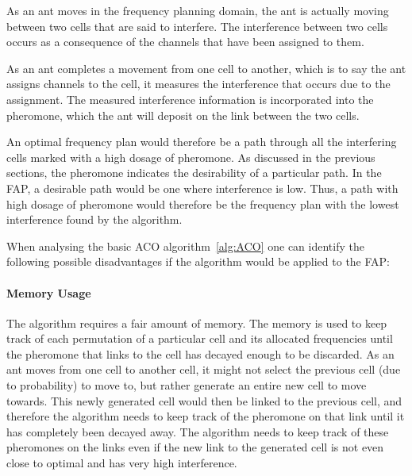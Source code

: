 As an ant moves in the frequency planning domain, the ant is actually moving between two cells that are said to interfere. The interference between two cells occurs as a consequence of the channels that have been assigned to them. 

As an ant completes a movement from one cell to another, which is to say the ant assigns channels to the cell, it measures the interference that occurs due to the assignment.  The measured interference information is incorporated into the pheromone, which the ant will deposit on the link between the two cells.

An optimal frequency plan would therefore be a path through all the interfering cells marked with a high dosage of pheromone. As discussed in the previous sections, the pheromone indicates the desirability of a particular path. In the FAP, a desirable path would be one where interference is low. Thus, a path with high dosage of pheromone would therefore be the frequency plan with the lowest interference found by the algorithm.

When analysing the basic ACO algorithm~\ref{alg:ACO} one can identify the following possible disadvantages if the algorithm would be applied to the FAP:
\paragraph{Memory Usage}
The algorithm requires a fair amount of memory. The memory is used to keep track of each permutation of a particular cell and its allocated frequencies until the pheromone that links to the cell has decayed enough to be discarded. As an ant moves from one cell to another cell, it might not select the previous cell (due to probability) to move to, but rather generate an entire new cell to move towards. This newly generated cell would then be linked to the previous cell, and therefore the algorithm needs to keep track of the pheromone on that link until it has completely been decayed away. The algorithm needs to keep track of these pheromones on the links even if the new link to the generated cell is not even close to optimal and has very high interference.
